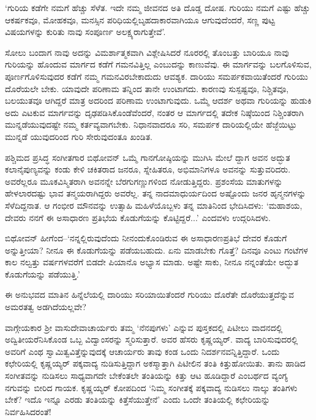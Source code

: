 ‘ಗುರಿಯ ಕಡೆಗೇ ನಮಗೆ ಹೆಚ್ಚು ಸೆಳೆತ. ಇದೇ ನಮ್ಮ ಜೀವನದ ಅತಿ ದೊಡ್ಡ ದೋಷ. ಗುರಿಯು ನಮಗೆ ಎಷ್ಟು ಹೆಚ್ಚು ಆಕರ್ಷಕವೂ, ಮೋಹಕವೂ, ಮನಸ್ಸಿನ ಪರಿಧಿಯಲ್ಲಿ\break ಬೃಹದಾಕಾರವಾಗಿಯೂ ಆಗುವುದೆಂದರೆ, ಸಣ್ಣ ಪುಟ್ಟ ವಿಷಯಗಳನ್ನು ಕುರಿತು ನಾವು ಸಂಪೂರ್ಣ ಅಲಕ್ಷ್ಯರಾಗುತ್ತೇವೆ’.

ಸೋಲು ಬಂದಾಗ ನಾವು ಅದನ್ನು ವಿಮರ್ಶಾತ್ಮಕವಾಗಿ ವಿಶ್ಲೇಷಿಸಿದರೆ ನೂರರಲ್ಲಿ ತೊಂಬತ್ತು ಬಾರಿಯೂ ನಾವು ಗುರಿಯನ್ನು ಹೊಂದುವ ಮಾರ್ಗದ ಕಡೆಗೆ ಗಮನವಿತ್ತಿಲ್ಲ ಎಂಬುದನ್ನು ಕಾಣುವೆವು. ಈ ಮಾರ್ಗವನ್ನು ಬಲಗೊಳಿಸುವ, ಪೂರ್ಣಗೊಳಿಸುವುದರ ಕಡೆಗೆ ನಮ್ಮ ಗಮನವಿರಬೇಕಾದುದು ಆವಶ್ಯಕ. ದಾರಿಯು ಸಮರ್ಪಕವಾಯಿತೆಂದರೆ ಗುರಿಯು ದೊರೆಯಲೇ ಬೇಕು. ಯಾವುದೇ ಪರಿಣಾಮ ತನ್ನಿಂದ ತಾನೇ ಉಂಟಾಗದು. ಕಾರಣವು ಸುಸ್ಪಷ್ಟವೂ, ನಿಶ್ಚಿತವೂ, ಬಲಯುತವೂ ಆಗಿದ್ದರೆ ಮಾತ್ರ ಅದರಿಂದ ಪರಿಣಾಮ ಉಂಟಾಗುವುದು. ಒಮ್ಮೆ ಆದರ್ಶ ಅಥವಾ ಗುರಿಯನ್ನು ಹುಡುಕಿ ಅದು ಎಟಕುವ ಮಾರ್ಗವನ್ನು ದೃಢಪಡಿಸಿಕೊಂಡೆವೆಂದರೆ, ನಂತರ ಆ ಮಾರ್ಗದಲ್ಲಿ ತದೇಕ ನಿಷ್ಠೆಯಿಂದ ನಿಶ್ಚಿಂತರಾಗಿ ಮುನ್ನಡೆಯುವುದಷ್ಟೇ ನಮ್ಮ ಕರ್ತವ್ಯವಾಗಬೇಕು. ನಿಧಾನವಾದರೂ ಸರಿ, ಸಮರ್ಪಕ ದಾರಿಯಲ್ಲಿಯೇ ಹೆಜ್ಜೆಯಿಟ್ಟು ಮುನ್ನಡೆ ಯುವುದರಿಂದ ಗುರಿ ಸೇರುವುದಂತೂ ಖಂಡಿತ.

ಪಶ್ಚಿಮದ ಪ್ರಸಿದ್ಧ ಸಂಗೀತಗಾರ ಬಿಥೋವನ್ ಒಮ್ಮೆ ಗಾನಗೋಷ್ಠಿಯನ್ನು ಮುಗಿಸಿ ಮೇಲೆ ದ್ದಾಗ ಅವನ ಅದ್ಭುತ ಕಲಾನೈಪುಣ್ಯವನ್ನು ಕಂಡು ಕೇಳಿ ಚಕಿತರಾದ ಜನರೂ, ಸ್ನೇಹಿತರೂ, ಅಭಿಮಾನಿಗಳೂ ಅವನನ್ನು ಸುತ್ತುವರಿದರು. ಅವರೆಲ್ಲರೂ ಮೂಕವಿಸ್ಮಿತರಾಗಿ ಅವನನ್ನೇ ಬೆರಗು\-ಗಣ್ಣುಗಳಿಂದ ನೋಡುತ್ತಿದ್ದರು. ಪ್ರಶಂಸೆಯ ಮಾತುಗಳನ್ನು ಹೇಳಲಾರದಷ್ಟು ಭಾವ ತನ್ಮಯ\-ರಾಗಿದ್ದರು ಅವರೆಲ್ಲ. ತನ್ನ ನಾದಮಾಧುರ್ಯದಿಂದ ಅಷ್ಟೊಂದು ಜನರ ಹೃನ್ಮನಗಳನ್ನು ಸೆಳೆದಿದ್ದ\-ನಾತ. ಆ ಗಂಭೀರ ಮೌನವನ್ನು ಉತ್ಸಾಹಿ ಮಹಿಳೆಯೊಬ್ಬಳು ತನ್ನ ಮಾತಿನಿಂದ ಭೇದಿಸಿದಳು: ‘ಮಹಾಶಯ, ದೇವರು ನನಗೆ ಈ ಅಸಾಧಾರಣ ಪ್ರತಿಭೆಯ ಕೊಡುಗೆಯನ್ನು ಕೊಟ್ಟಿದ್ದರೆ...’ ಎಂದವಳು ಉದ್ಗರಿಸಿದಳು.

ಬಿಥೋವನ್ ಹೀಗೆಂದ–‘ನನ್ನಲ್ಲಿರುವುದೆಂದು ನೀನಂದುಕೊಂಡಿರುವ ಈ ಅಸಾಧಾರಣ\break ಪ್ರತಿಭೆ ದೇವರ ಕೊಡುಗೆ ಅನ್ನುತ್ತೀಯಾ? ನೀನೂ ಈ ಕೊಡುಗೆಯನ್ನು ಪಡೆಯಬಹುದು. ಏನು ಮಾಡಬೇಕು ಗೊತ್ತೆ? ದಿನವೂ ಎಂಟು ಗಂಟೆಗಳ ಕಾಲ ನಲ್ವತ್ತು ವರ್ಷಗಳವರೆಗೆ ಬಿಡದೇ ಪಿಯಾನೊ ಅಭ್ಯಾಸ ಮಾಡು. ಅಷ್ಟೇ ಸಾಕು, ನೀನೂ ನನ್ನಂತೆಯೇ ಅದ್ಭುತ ಕೊಡುಗೆಯನ್ನು ಪಡೆಯುತ್ತಿ.’

ಈ ಅನುಭವದ ಮಾತಿನ ಹಿನ್ನೆಲೆಯಲ್ಲಿ ದಾರಿಯು ಸರಿಯಾಯಿತೆಂದರೆ ಗುರಿಯು ದೊರೆತೇ ದೊರೆಯುತ್ತದೆನ್ನುವ ಅಮರತತ್ವ ಅಡಗಿದೆಯಲ್ಲವೇ?

ವಾಗ್ಗೇಯಕಾರ ಶ‍್ರೀ ವಾಸುದೇವಾಚಾರ್ಯರು ತಮ್ಮ ‘ನೆನಪುಗಳು’ ಎನ್ನುವ ಪುಸ್ತಕದಲ್ಲಿ ಪಿಟೀಲು ವಾದನದಲ್ಲಿ ಅದ್ವಿತೀಯರೆನಿಸಿಕೊಂಡ ಒಬ್ಬ ವಿದ್ವಾಂಸರನ್ನು ಸ್ಮರಿಸುತ್ತಾರೆ. ಅವರ ಹೆಸರು ಕೃಷ್ಣಯ್ಯರ್. ವಾದ್ಯ ಬಾರಿಸುವುದರಲ್ಲಿ ಅವರಿಗೆ ಎಂಥ ಸ್ವಾಮಿತ್ವವಿತ್ತೆನ್ನುವುದಕ್ಕೆ ಆಚಾರ್ಯರು ತಾವು ಕಂಡ ಒಂದು ನಿದರ್ಶನವನ್ನಿತ್ತಿದ್ದಾರೆ. ಒಂದು ಕಛೇರಿಯಲ್ಲಿ ಕೃಷ್ಣಯ್ಯರ್ ಪಕ್ಕವಾದ್ಯ ನುಡಿಸುತ್ತಿದ್ದಾಗ ಅಕಸ್ಮಾತ್ತಾಗಿ ಪಿಟೀಲಿನ ತಂತಿ ಕಿತ್ತುಹೋಯಿತು. ತಾನು ಹಾಡಿದ ಸಂಗೀತವನ್ನು ನುಡಿಸಲು ಸಾಧ್ಯವಾಗದೇ ಬೇಕೆಂತಲೇ ತಂತಿಯನ್ನು ಕಿತ್ತು ಆಟ ಹೂಡಿದ್ದಾರೆ ಎಂಬರ್ಥದ ವ್ಯಂಗ್ಯ ನಗುವನ್ನು ಬೀರಿದ ಗಾಯಕ. ಕೃಷ್ಣಯ್ಯರ್ ಕೋಪದಿಂದ ‘ನಿಮ್ಮ ಸಂಗೀತಕ್ಕೆ ಪಕ್ಕವಾದ್ಯ ನುಡಿಸಲು ನಾಲ್ಕು ತಂತಿಗಳು ಬೇಕೆ? ಇದೊ ಇನ್ನೂ ಎರಡು ತಂತಿಯನ್ನು ಕಿತ್ತೆಸೆಯುತ್ತೇನೆ’ ಎಂದು ಒಂದೇ ತಂತಿಯಲ್ಲಿ ಕಛೇರಿಯನ್ನು ನಿರ್ವಹಿಸಿದರಂತೆ!

